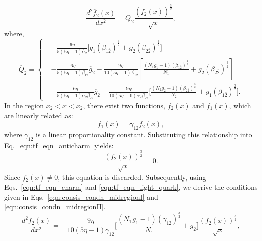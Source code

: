 \documentclass[fleqn]{article}
\begin{document}
            \begin{equation}
                   \frac{d^2\overline{f}_{2}(x)}{dx^2} = \overline{Q}_{2} \frac{\left(\overline{f}_{2}(x)\right)^\frac{3}{2}}{\sqrt{x}},
                    \label{eq:diff_eqn_f2bar_caseI}
            \end{equation}
            where,  
            \begin{equation}
                \overline{Q}_{2} = \left\{
                \begin{aligned} 
                        & -\frac{6\eta}{5(5\eta-1) \overline{\alpha}_2} \biggl[ g_1 (\beta_{1\overline{2}})^\frac{3}{2} + g_2 (\beta_{2\overline{2}})^\frac{3}{2}
                        \biggr] \\ &
                        - \frac{6 \eta}{5 (5 \eta -1) \beta_{1\overline{2}}}\overline{g}_{2} -\frac{9\eta}{10(5\eta-1)\beta_{1\overline{2}}}\left[\frac{(N_1 g_1-1)(\beta_{1\overline{2}})^\frac{3}{2}}{N_1} 
                     + g_2 (\beta_{2\overline{2}})^\frac{3}{2} \right] \\ &
                                   -\frac{6\eta}{5(5\eta-1) \alpha_2 \beta_{2\overline{2}}}    \overline{g}_{2} - \frac{9\eta}{10(5\eta-1) \alpha_2 \beta_{2\overline{2}}}\biggl[\frac{(N_2 g_2-1)(\beta_{2\overline{2}})^\frac{3}{2}}{N_2}      + g_1 (\beta_{1\overline{2}})^\frac{3}{2}\biggr].
                \end{aligned}
                \right. \label{eq:consis_condn_f2bar_caseI}
            \end{equation}                      
            In the region $\overline{x}_{2} < x < x_2$, there exist two functions, $f_2(x)$ and $f_1(x)$, which are linearly related as:  
            \[
            f_1(x) = \gamma_{12} f_2(x),
            \]  
            where $\gamma_{12}$ is a linear proportionality constant. Substituting this relationship into Eq.~\eqref{eqn:tf_eqn_anticharm} yields:  
            \[
            \frac{(f_2(x))^{\frac{3}{2}}}{\sqrt{x}} = 0.
            \]  
            Since $f_2(x) \neq 0$, this equation is discarded. Subsequently, using Eqs.~\eqref{eqn:tf_eqn_charm} and \eqref{eqn:tf_eqn_light_quark}, we derive the conditions given in Eqs.~\eqref{eqn:consis_condn_midregionI} and \eqref{eqn:consis_condn_midregionII}. 
            \begin{equation}
                  \frac{d^2 f_2(x)}{dx^2}= -\frac{9\eta}{10(5\eta-1)  \gamma_{12} }\biggl[\frac{(N_1 g_1-1)(\gamma_{12})^\frac{3}{2}}{N_1} + g_2 \biggr]\frac{\left( f_2(x) \right)^\frac{3}{2}}{\sqrt{x}},
                    \label{eqn:consis_condn_midregionI}
            \end{equation}
\end{document}
